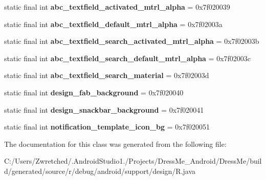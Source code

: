 \begin{DoxyCompactItemize}
\item 
\hypertarget{classandroid_1_1support_1_1design_1_1_r_1_1drawable_aa02b26fea5203408b3ddbc9b3d851b43}{}static final int {\bfseries abc\+\_\+textfield\+\_\+activated\+\_\+mtrl\+\_\+alpha} = 0x7f020039\label{classandroid_1_1support_1_1design_1_1_r_1_1drawable_aa02b26fea5203408b3ddbc9b3d851b43}

\item 
\hypertarget{classandroid_1_1support_1_1design_1_1_r_1_1drawable_a83013ff30b4b94fce2e82793a1d333fe}{}static final int {\bfseries abc\+\_\+textfield\+\_\+default\+\_\+mtrl\+\_\+alpha} = 0x7f02003a\label{classandroid_1_1support_1_1design_1_1_r_1_1drawable_a83013ff30b4b94fce2e82793a1d333fe}

\item 
\hypertarget{classandroid_1_1support_1_1design_1_1_r_1_1drawable_ab64a8a976522cb59b31240bf4b5e64d5}{}static final int {\bfseries abc\+\_\+textfield\+\_\+search\+\_\+activated\+\_\+mtrl\+\_\+alpha} = 0x7f02003b\label{classandroid_1_1support_1_1design_1_1_r_1_1drawable_ab64a8a976522cb59b31240bf4b5e64d5}

\item 
\hypertarget{classandroid_1_1support_1_1design_1_1_r_1_1drawable_ab66a327f415e4174b7123e9304719789}{}static final int {\bfseries abc\+\_\+textfield\+\_\+search\+\_\+default\+\_\+mtrl\+\_\+alpha} = 0x7f02003c\label{classandroid_1_1support_1_1design_1_1_r_1_1drawable_ab66a327f415e4174b7123e9304719789}

\item 
\hypertarget{classandroid_1_1support_1_1design_1_1_r_1_1drawable_a598e8d229c729b88ac087f388a110253}{}static final int {\bfseries abc\+\_\+textfield\+\_\+search\+\_\+material} = 0x7f02003d\label{classandroid_1_1support_1_1design_1_1_r_1_1drawable_a598e8d229c729b88ac087f388a110253}

\item 
\hypertarget{classandroid_1_1support_1_1design_1_1_r_1_1drawable_a0d7cbbfe5f73f4ebc521ac3831a8f7fa}{}static final int {\bfseries design\+\_\+fab\+\_\+background} = 0x7f020040\label{classandroid_1_1support_1_1design_1_1_r_1_1drawable_a0d7cbbfe5f73f4ebc521ac3831a8f7fa}

\item 
\hypertarget{classandroid_1_1support_1_1design_1_1_r_1_1drawable_a814061df3be11306bb3c0cddedfbcf5f}{}static final int {\bfseries design\+\_\+snackbar\+\_\+background} = 0x7f020041\label{classandroid_1_1support_1_1design_1_1_r_1_1drawable_a814061df3be11306bb3c0cddedfbcf5f}

\item 
\hypertarget{classandroid_1_1support_1_1design_1_1_r_1_1drawable_ad7bdcd3290edcef20952638a119d6d7d}{}static final int {\bfseries notification\+\_\+template\+\_\+icon\+\_\+bg} = 0x7f020051\label{classandroid_1_1support_1_1design_1_1_r_1_1drawable_ad7bdcd3290edcef20952638a119d6d7d}

\end{DoxyCompactItemize}


The documentation for this class was generated from the following file\+:\begin{DoxyCompactItemize}
\item 
C\+:/\+Users/\+Zwretched/.\+Android\+Studio1./\+Projects/\+Dress\+Me\+\_\+\+Android/\+Dress\+Me/build/generated/source/r/debug/android/support/design/R.\+java\end{DoxyCompactItemize}
